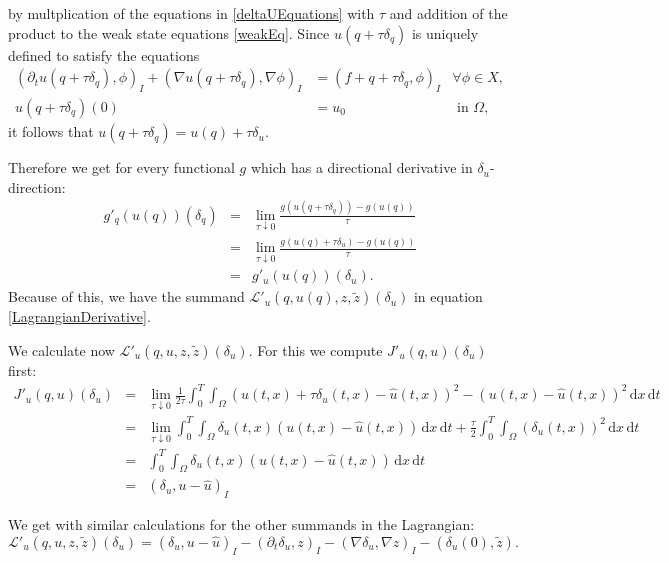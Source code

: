 by multplication of the equations in \eqref{deltaUEquations} with $\tau$ and addition of the product to the weak state equations \eqref{weakEq}. Since $u(q+\tau\delta_q)$ is uniquely defined to satisfy the equations
\begin{equation*}
\begin{aligned}
	(\partial_tu(q+\tau\delta_q),\phi)_I+(\nabla u(q+\tau\delta_q),\nabla\phi)_I&=(f+q+\tau\delta_q,\phi)_I&\forall\phi\in X,\\
	u(q+\tau\delta_q)(0)&=u_0&\text{ in }\Omega,
\end{aligned}
\end{equation*}
it follows that $u(q+\tau\delta_q)=u(q)+\tau\delta_u$.

Therefore we get for every functional $g$ which has a directional derivative in $\delta_u$-direction:
\begin{eqnarray*}
g'_q(u(q))(\delta_q)&=&\lim_{\tau\downarrow0}\frac{g(u(q+\tau\delta_q))-g(u(q))}{\tau}\\
&=&\lim_{\tau\downarrow0}\frac{g(u(q)+\tau\delta_u)-g(u(q))}{\tau}\\
&=&g'_u(u(q))(\delta_u).
\end{eqnarray*}
Because of this, we have the summand $\mathcal{L}'_u(q,u(q),z,\tilde{z})(\delta_u)$ in equation \eqref{LagrangianDerivative}.

We calculate now $\mathcal{L}'_u(q,u,z,\tilde{z})(\delta_u)$. For this we compute $J'_u(q, u)(\delta_u)$ first:
\begin{eqnarray*}
J'_u(q, u)(\delta_u)&=&\lim_{\tau\downarrow0}\frac{1}{2\tau}\int_0^T\int_\Omega(u(t,x)+\tau\delta_u(t, x)-\hat{u}(t,x))^2-(u(t,x)-\hat{u}(t,x))^2\,\mathrm{d}x\,\mathrm{d}t\\
&=&\lim_{\tau\downarrow0}\int_0^T\int_\Omega\delta_u(t, x)(u(t,x)-\hat{u}(t,x))\,\mathrm{d}x\,\mathrm{d}t+\frac{\tau}{2}\int_0^T\int_\Omega(\delta_u(t, x))^2\,\mathrm{d}x\,\mathrm{d}t\\
&=&\int_0^T\int_\Omega\delta_u(t, x)(u(t,x)-\hat{u}(t,x))\,\mathrm{d}x\,\mathrm{d}t\\
&=&(\delta_u,u-\hat{u})_I
\end{eqnarray*}

We get with similar calculations for the other summands in the Lagrangian:
\begin{equation*}
\mathcal{L}'_u(q,u,z,\tilde{z})(\delta_u)=(\delta_u,u-\hat{u})_I-(\partial_t\delta_u,z)_I-(\nabla\delta_u,\nabla z)_I-(\delta_u(0),\tilde{z}).
\end{equation*}

